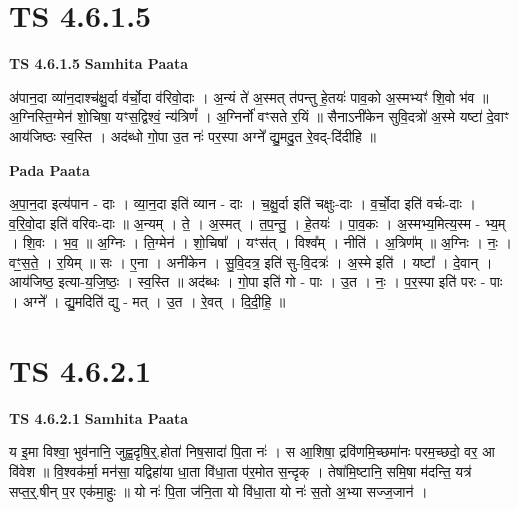 \documentclass[17pt]{extarticle}
\begin{document}
\section*{ TS 4.6.1.5 }

\textbf{TS 4.6.1.5 } \newline
\textbf{Samhita Paata} \newline

अ॑पान॒दा व्या॑न॒दाश्च॑क्षु॒र्दा व॑र्चो॒दा व॑रिवो॒दाः । अ॒न्यं ते॑ अ॒स्मत् त॑पन्तु हे॒तयः॑ पाव॒को अ॒स्मभ्यꣳ॑ शि॒वो भ॑व ॥ अ॒ग्निस्ति॒ग्मेन॑ शो॒चिषा॒ यꣳस॒द्विश्वं॒ न्य॑त्रिणं᳚ । अ॒ग्निर्नो॑ वꣳसते र॒यिं ॥ सैनाऽनी॑केन सुवि॒दत्रो॑ अ॒स्मे यष्टा॑ दे॒वाꣳ आय॑जिष्ठः स्व॒स्ति । अद॑ब्धो गो॒पा उ॒त नः॑ पर॒स्पा अग्ने᳚ द्यु॒मदु॒त रे॒वद्-दि॑दीहि ॥ \newline

\textbf{Pada Paata} \newline

अ॒पा॒न॒दा इत्य॑पान - दाः । व्या॒न॒दा इति॑ व्यान - दाः । च॒क्षु॒र्दा इति॑ चक्षुः-दाः । व॒र्चो॒दा इति॑ वर्चः-दाः । व॒रि॒वो॒दा इति॑ वरिवः-दाः ॥ अ॒न्यम् । ते॒ । अ॒स्मत् । त॒प॒न्तु॒ । हे॒तयः॑ । पा॒व॒कः । अ॒स्मभ्य॒मित्य॒स्म - भ्य॒म् । शि॒वः । भ॒व॒ ॥ अ॒ग्निः । ति॒ग्मेन॑ । शो॒चिषा᳚ । यꣳस॑त् । विश्व᳚म् । नीति॑ । अ॒त्रिण᳚म् ॥ अ॒ग्निः । नः॒ । वꣳ॒॒स॒ते॒ । र॒यिम् ॥ सः । ए॒ना । अनी॑केन । सु॒वि॒दत्र॒ इति॑ सु-वि॒दत्रः॑ । अ॒स्मे इति॑ । यष्टा᳚ । दे॒वान् । आय॑जिष्ठ॒ इत्या-य॒जि॒ष्ठः॒ । स्व॒स्ति ॥ अद॑ब्धः । गो॒पा इति॑ गो - पाः । उ॒त । नः॒ । प॒र॒स्पा इति॑ परः - पाः । अग्ने᳚ । द्यु॒मदिति॑ द्यु - मत् । उ॒त । रे॒वत् । दि॒दी॒हि॒ ॥  \newline




\section*{ TS 4.6.2.1 }

\textbf{TS 4.6.2.1 } \newline
\textbf{Samhita Paata} \newline

य इ॒मा विश्वा॒ भुव॑नानि॒ जुह्व॒दृषि॒र्॒.होता॑ निष॒सादा॑ पि॒ता नः॑ । स आ॒शिषा॒ द्रवि॑णमि॒च्छमा॑नः परम॒च्छदो॒ वर॒ आ वि॑वेश ॥ वि॒श्वक॑र्मा॒ मन॑सा॒ यद्विहा॑या धा॒ता वि॑धा॒ता प॑र॒मोत स॒न्दृक् । तेषा॑मि॒ष्टानि॒ समि॒षा म॑दन्ति॒ यत्र॑ सप्त॒र्॒.षीन् प॒र एक॑मा॒हुः ॥ यो नः॑ पि॒ता ज॑नि॒ता यो वि॑धा॒ता यो नः॑ स॒तो अ॒भ्या सज्ज॒जान॑ । \newline
\end{document}
